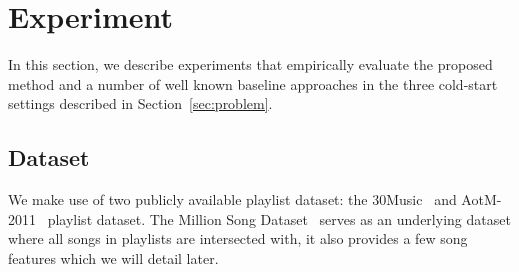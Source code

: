 \section{Experiment}
\label{sec:experiment}

In this section, we describe experiments that empirically evaluate the proposed method and a number of 
well known baseline approaches in the three cold-start settings described in Section~\ref{sec:problem}.


\subsection{Dataset}
We make use of two publicly available playlist dataset: the 30Music~\cite{30music2015} and AotM-2011~\cite{mcfee2012hypergraph} playlist dataset.
The Million Song Dataset~\cite{msd2011} serves as an underlying dataset where all songs in playlists are intersected with,
it also provides a few song features which we will detail later.


\begin{table}[!b]
\centering
\caption{Music playlist dataset}
\label{tab:stats_pldata}
\end{table}


